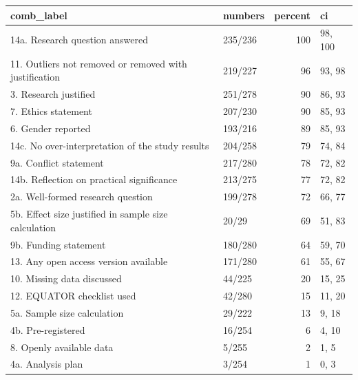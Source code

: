 \begin{table}[ht]
\centering
\begin{tabular}{llrl}
 comb\_label & numbers & percent & ci \\ 
  \hline
14a. Research question answered & 235/236 & 100 & 98, 100 \\ 
  11. Outliers not removed or removed with justification & 219/227 & 96 & 93, 98 \\ 
  3. Research justified & 251/278 & 90 & 86, 93 \\ 
  7. Ethics statement & 207/230 & 90 & 85, 93 \\ 
  6. Gender reported & 193/216 & 89 & 85, 93 \\ 
  14c. No over-interpretation of the study results & 204/258 & 79 & 74, 84 \\ 
  9a. Conflict statement & 217/280 & 78 & 72, 82 \\ 
  14b. Reflection on practical significance & 213/275 & 77 & 72, 82 \\ 
  2a. Well-formed research question & 199/278 & 72 & 66, 77 \\ 
  5b. Effect size justified in sample size calculation & 20/29 & 69 & 51, 83 \\ 
  9b. Funding statement & 180/280 & 64 & 59, 70 \\ 
  13. Any open access version available & 171/280 & 61 & 55, 67 \\ 
  10. Missing data discussed & 44/225 & 20 & 15, 25 \\ 
  12. EQUATOR checklist used & 42/280 & 15 & 11, 20 \\ 
  5a. Sample size calculation & 29/222 & 13 & 9, 18 \\ 
  4b. Pre-registered & 16/254 & 6 & 4, 10 \\ 
  8. Openly available data & 5/255 & 2 & 1, 5 \\ 
  4a. Analysis plan & 3/254 & 1 & 0, 3 \\ 
  \end{tabular}
\end{table}

